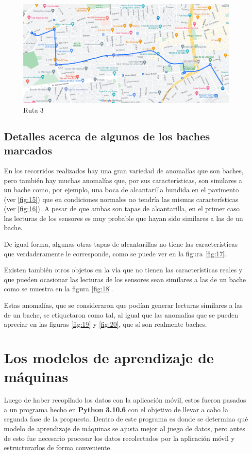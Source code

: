 	\begin{figure}[htb]
		\centering
		\includegraphics[scale = 0.4]{Graphics/route_3_EgidoArsenal_LyJovellarHotelColina.png}
		\caption{Ruta 3}
		\label{fig:12}
	\end{figure}

	\subsection{Detalles acerca de algunos de los baches marcados}
		En los recorridos realizados hay una gran variedad de anomalías que son baches, pero también hay muchas anomalías que, por sus características,
		son similares a un bache como, por ejemplo, una boca de alcantarilla hundida en el pavimento (ver \ref{fig:15}) que en condiciones normales no 
		tendría las mismas características (ver \ref{fig:16}). A pesar de que ambas son tapas de alcantarilla, en el primer caso las lecturas de los 
		sensores es muy probable que hayan sido similares a las de un bache.

		De igual forma, algunas otras tapas de alcantarillas no tiene las características que verdaderamente le corresponde, como se puede ver en la
		figura \ref{fig:17}.

		Existen también otros objetos en la vía que no tienen las características reales y que pueden ocasionar las lecturas de los sensores sean similares
		a las de un bache como se muestra en la figura \ref{fig:18}.

		Estas anomalías, que se consideraron que podían generar lecturas	similares a las de un bache, se etiquetaron como tal, al igual que las anomalías que se 
		pueden apreciar en las figuras \ref{fig:19} y \ref{fig:20}, que sí son realmente baches.

\section{Los modelos de aprendizaje de máquinas}
	Luego de haber recopilado los datos con la aplicación móvil, estos fueron pasados a un programa hecho en \textbf{Python 3.10.6} con el objetivo
	de llevar a cabo la segunda fase de la propuesta. Dentro de este programa es donde se determina qué modelo de aprendizaje de máquinas se ajusta
	mejor al juego de datos, pero antes de esto fue necesario procesar los datos recolectados por la aplicación móvil y estructurarlos de forma conveniente. 

